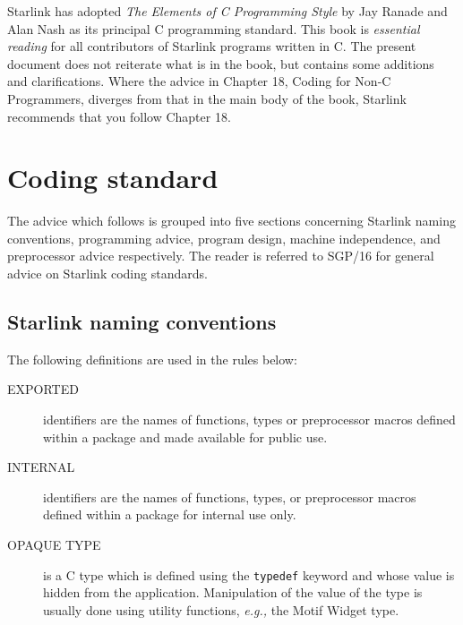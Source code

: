 Starlink has adopted {\sl The Elements of C Programming Style} by Jay Ranade 
and Alan Nash as its principal C programming standard.  This book is 
{\it essential reading}\/ for all contributors of Starlink programs written in 
C. The present document does not reiterate 
what is in the book, but contains some additions and clarifications.  Where 
the advice in Chapter 18, Coding for Non-C Programmers, diverges from 
that in the main body of the book, Starlink recommends that you follow  
Chapter 18.


\section{Coding standard}

The advice which follows is grouped into five sections concerning 
Starlink naming conventions, programming advice, program design, 
machine independence, and preprocessor advice respectively.  The reader is 
referred to SGP/16 for general advice on Starlink coding standards.

\subsection{Starlink naming conventions}

The following definitions are used in the rules below:

\begin{description}
\item [EXPORTED] identifiers are the names of functions, types or preprocessor 
macros defined within a package and made available for public use.
\item [INTERNAL] identifiers are the names of functions, types, or 
preprocessor macros defined within a package for internal use only.
\item [OPAQUE TYPE] is a C type which is defined using the \verb~typedef~ 
keyword and whose 
value is hidden from the application.  Manipulation of the value of the type 
is usually done using utility functions, {\em e.g.,} the Motif Widget type.
\end{description}


